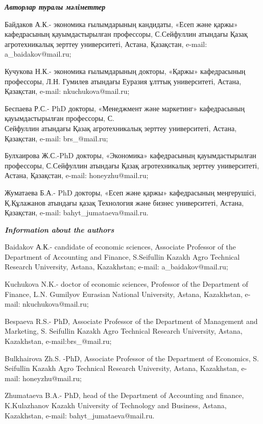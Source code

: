 \begin{authorinfo}
\emph{{\bfseries Авторлар туралы мәліметтер}}

Байдаков А.К.- экономика ғылымдарының кандидаты, «Есеп және қаржы»
кафедрасының қауымдастырылған профессоры, С.Сейфуллин атындағы Қазақ
агротехникалық зерттеу университеті, Астана, Қазақстан, e-mail:
a\_baidakov@mail.ru;

Кучукова Н.К.- экономика ғылымдарының докторы, «Қаржы» кафедрасының
профессоры, Л.Н. Гумилев атындағы Еуразия ұлттық университеті, Астана,
Қазақстан, e-mail: nkuchukova@mail.ru;

Беспаева Р.С.- PhD докторы, «Менеджмент және маркетинг» кафедрасының
қауымдастырылған профессоры, С. \\Сейфуллин атындағы Қазақ агротехникалық
зерттеу университеті, Астана, Қазақстан, e-mail: brs\_@mail.ru;

Булхаирова Ж.С.-PhD докторы, «Экономика» кафедрасының қауымдастырылған
профессоры, С.Сейфуллин атындағы Қазақ агротехникалық зерттеу
университеті, Астана, Қазақстан, e-mail: honeyzhu@mail.ru;

Жуматаева Б.А.- PhD докторы, «Есеп және қаржы» кафедрасының меңгерушісі,
Қ.Құлажанов атындағы қазақ Технология және бизнес университеті, Астана,
Қазақстан, e-mail: bahyt\_jumataeva@mail.ru.

\emph{{\bfseries Information about the authors}}

Baidakov А.К.- candidate of economic sciences, Associate Professor of
the Department of Accounting and Finance, S.Seifullin Kazakh Agro
Technical Research University, Astana, Kazakhstan; e-mail:
a\_baidakov@mail.ru;

Kuchukova N.K.- doctor of economic sciences, Professor of the Department
of Finance, L.N. Gumilyov Eurasian National University, Astana,
Kazakhstan, e-mail: nkuchukova@mail.ru;

Bespaeva R.S.- PhD, Associate Professor of the Department of Management
and Marketing, S. Seifullin Kazakh Agro Technical Research University,
Astana, Kazakhstan, e-mail:brs\_@mail.ru;

Bulkhairova Zh.S. -PhD, Associate Professor of the Department of
Economics, S. Seifullin Kazakh Agro Technical Research University,
Astana, Kazakhstan, e-mail: honeyzhu@mail.ru;

Zhumataeva B.A.- PhD, head of the Department of Accounting and finance,
K.Kulazhanov Kazakh University of Technology and Business, Astana,
Kazakhstan, e-mail: bahyt\_jumataeva@mail.ru.
\end{authorinfo}
